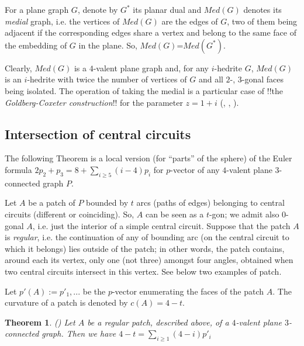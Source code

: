 \documentclass[12pt]{article}
\newtheorem{theorem}{Theorem}
\begin{document}
For a plane graph $G$, denote by $G^*$ its planar dual and {\em $Med(G)$} 
denotes its {\em medial} graph, i.e. the vertices of $Med(G)$ are the edges of 
$G$, two of them being adjacent if the corresponding edges share a vertex and 
belong to the same face of the embedding of $G$ in the plane. 
So, $Med(G)$=$Med(G^*)$.

Clearly, $Med(G)$ is a $4$-valent plane graph and, for any $i$-hedrite $G$, $Med(G)$ is an $i$-hedrite with twice the number of vertices of $G$ and all $2$-, $3$-gonal faces being isolated. The operation of taking the medial is a particular case of !!the {\em Goldberg-Coxeter construction}!! for the parameter $z=1+i$ (\cite{Gold37}, \cite{Cox71}, \cite{DD}).





\subsection{Intersection of central circuits}

The following Theorem is a local version (for ``parts'' of the sphere) of
the Euler formula
$2p_2+p_3=8+ \sum_{i\geq 5} (i-4)p_i$ for $p$-vector of any $4$-valent 
plane $3$-connected graph $P$.

Let $A$ be a patch of $P$ bounded by $t$ arcs (paths of edges) belonging to 
central circuits (different or coinciding). So, $A$ can be seen as a 
$t$-gon; we admit also $0$-gonal $A$, i.e.
just the interior of a simple central circuit. Suppose that the patch $A$ is
{\em regular}, i.e.
the continuation of any of bounding arc (on the central circuit to which it
belongs) lies outside of the patch; in other words, the patch
contains, around each its vertex, only one (not three) amongst four angles, 
obtained when two central circuits intersect in this vertex.  See below two 
examples of patch.

\begin{center}
\epsfxsize=60mm
\end{center}

Let $p'(A):=p'_1,...$ be the $p$-vector enumerating the faces of the patch $A$. The curvature of a patch is denoted by $c(A)=4-t$.

\begin{theorem} \label{Local-Euler-Formula}(\cite{DSt})
Let $A$ be a regular patch, described above, of a $4$-valent plane
$3$-connected graph. Then we have $4-t=\sum_{i\geq 1} (4-i)p'_i$
\end{theorem}
\end{document}

